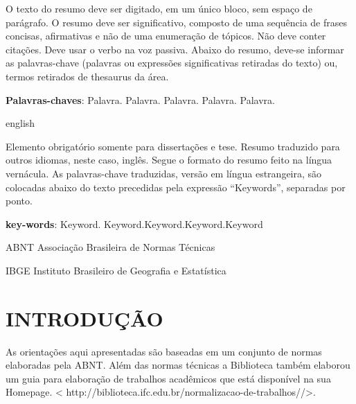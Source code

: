 \documentclass[12pt, openright, oneside, a4paper, brazil]{abntex2}
\begin{document}
\setlength{\absparsep}{18pt} %
\begin{resumo} 


O texto do resumo deve ser digitado, em um único bloco, sem espaço de parágrafo. O resumo deve ser significativo, composto de uma sequência de frases concisas, afirmativas e não de uma enumeração de tópicos. Não deve conter citações. Deve usar o verbo na voz passiva. Abaixo do resumo, deve-se informar as palavras-chave (palavras ou expressões significativas retiradas do texto) ou, termos retirados de thesaurus da área. 

\textbf{Palavras-chaves}: Palavra. Palavra. Palavra. Palavra. Palavra. 
\end{resumo}

\begin{resumo}[Abstract]
 \begin{otherlanguage*}{english}   

Elemento obrigatório somente para dissertações e tese. Resumo traduzido para outros idiomas, neste caso, inglês. Segue o formato do resumo feito na língua vernácula. As palavras-chave traduzidas, versão em língua estrangeira, são colocadas abaixo do texto precedidas pela expressão “Keywords”, separadas por ponto.
  
  \textbf{key-words}: Keyword. Keyword.Keyword.Keyword.Keyword
 \end{otherlanguage*}
\end{resumo}

\listoffigures*
\cleardoublepage

\begin{siglas}

	\item[ABNT]{Associação Brasileira de Normas Técnicas}
   \item[IBGE]{Instituto Brasileiro de Geografia e Estatística} 

\end{siglas}
\tableofcontents*
\textual

\chapter{INTRODUÇÃO}

As orientações aqui apresentadas são baseadas em um conjunto de normas elaboradas pela ABNT. Além das normas técnicas a Biblioteca também elaborou  um guia para elaboração de trabalhos acadêmicos que está disponível na sua Homepage. < http://biblioteca.ifc.edu.br/normalizacao-de-trabalhos//>. 
\end{document}
